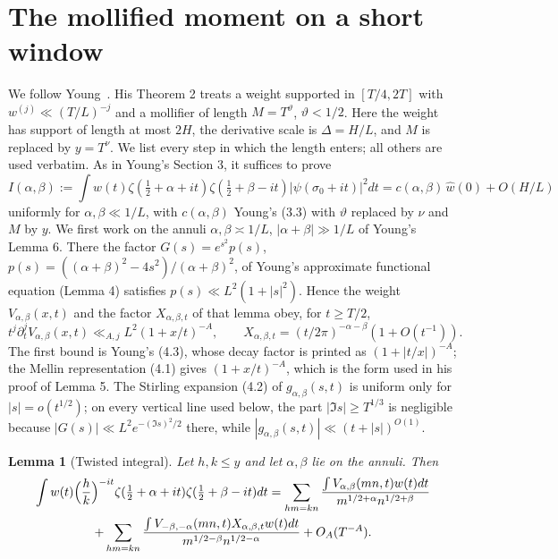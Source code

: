 \documentclass[11pt]{article}
\newtheorem{lemma}[theorem]{Lemma}
\theoremstyle{remark}
\newcommand{\wh}{\widehat w(0)}
\begin{document}
\section{The mollified moment on a short window}\label{sec:moment}

We follow Young~\cite{Young}. His Theorem 2 treats a weight supported in
$[T/4,2T]$ with $w^{(j)}\ll(T/L)^{-j}$ and a mollifier of length $M=T^{\vartheta}$,
$\vartheta<1/2$. Here the weight has support of length at most $2H$, the
derivative scale is $\Delta=H/L$, and $M$ is replaced by $y=T^\nu$. We list
every step in which the length enters; all others are used verbatim. As in
Young's Section 3, it suffices to prove
\begin{equation}\label{eq:Iab}
 I(\alpha,\beta):=\int w(t)\zeta(\tfrac12+\alpha+it)\zeta(\tfrac12+\beta-it)
 |\psi(\sigma_0+it)|^2dt=c(\alpha,\beta)\,\wh+O(H/L)
\end{equation}
uniformly for $\alpha,\beta\ll1/L$, with $c(\alpha,\beta)$ Young's (3.3)
with $\vartheta$ replaced by $\nu$ and $M$ by $y$. We first work on the annuli
$\alpha,\beta\asymp1/L$, $|\alpha+\beta|\gg1/L$ of Young's Lemma 6. There the
factor $G(s)=e^{s^2}p(s)$, $p(s)=((\alpha+\beta)^2-4s^2)/(\alpha+\beta)^2$, of
Young's approximate functional equation (Lemma 4) satisfies
$p(s)\ll L^2(1+|s|^2)$. Hence the weight $V_{\alpha,\beta}(x,t)$ and the
factor $X_{\alpha,\beta,t}$ of that lemma obey, for $t\ge T/2$,
\begin{equation}\label{eq:Vbound}
 t^j\partial_t^jV_{\alpha,\beta}(x,t)\ll_{A,j}L^2(1+x/t)^{-A},\qquad
 X_{\alpha,\beta,t}=(t/2\pi)^{-\alpha-\beta}(1+O(t^{-1})).
\end{equation}
The first bound is Young's (4.3), whose decay factor is printed as
$(1+|t/x|)^{-A}$; the Mellin representation (4.1) gives $(1+x/t)^{-A}$,
which is the form used in his proof of Lemma 5. The Stirling expansion (4.2)
of $g_{\alpha,\beta}(s,t)$ is uniform only for $|s|=o(t^{1/2})$; on every
vertical line used below, the part $|\Im s|\ge T^{1/3}$ is negligible because
$|G(s)|\ll L^2e^{-(\Im s)^2/2}$ there, while
$|g_{\alpha,\beta}(s,t)|\ll(t+|s|)^{O(1)}$.

\begin{lemma}[Twisted integral]\label{lem:twisted}
Let $h,k\le y$ and let $\alpha,\beta$ lie on the annuli. Then
\begin{multline*}
 \int w(t)\Bigl(\frac hk\Bigr)^{-it}\zeta(\tfrac12+\alpha+it)\zeta(\tfrac12+\beta-it)dt
 =\sum_{hm=kn}\frac{\int V_{\alpha,\beta}(mn,t)w(t)dt}{m^{1/2+\alpha}n^{1/2+\beta}}\\
 +\sum_{hm=kn}\frac{\int V_{-\beta,-\alpha}(mn,t)X_{\alpha,\beta,t}w(t)dt}{m^{1/2-\beta}n^{1/2-\alpha}}
 +O_A(T^{-A}).
\end{multline*}
\end{lemma}
\end{document}
